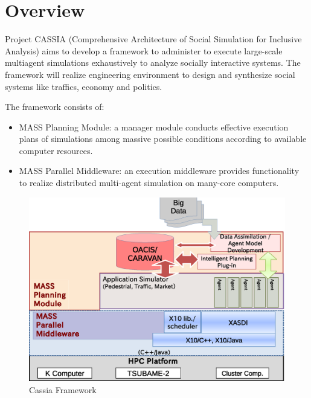 \section{Overview}
\label{s:Overview}

Project CASSIA (Comprehensive Architecture of Social Simulation for
Inclusive Analysis) aims to develop a framework to administer to
execute large-scale multiagent simulations exhaustively to analyze
socially interactive systems. The framework will realize engineering
environment to design and synthesize social systems like traffics,
economy and politics.

The framework consists of:
\begin{itemize}
  \item
    MASS Planning Module: a manager module conducts effective
    execution plans of simulations among massive possible conditions
    according to available computer resources.
  \item
    MASS Parallel Middleware: an execution middleware provides
    functionality to realize distributed multi-agent simulation on
    many-core computers.
\end{itemize}

\begin{figure}
  \centering
  \includegraphics[width=.8\linewidth]{Figs.noda/figure-01.framework.eps}
  \caption{Cassia Framework}
  \label{fig:Figs.noda/figure-01.framework.eps}
\end{figure}

